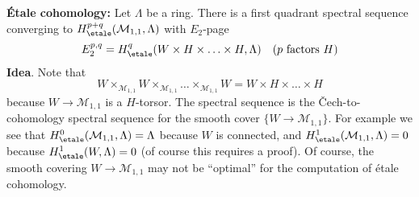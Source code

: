 \medskip\noindent
{\bf \'Etale cohomology:} Let $\Lambda$ be a ring.
There is a first quadrant spectral sequence
converging to $H^{p + q}_\etale(\mathcal{M}_{1, 1}, \Lambda)$
with $E_2$-page
$$
E_2^{p, q} = H_\etale^q(W \times H \times \ldots \times H, \Lambda)
\quad(p\text{ factors }H)
$$
{\bf Idea}. Note that
$$
W \times_{\mathcal{M}_{1, 1}} W \times_{\mathcal{M}_{1, 1}}
\ldots \times_{\mathcal{M}_{1, 1}} W
= W \times H \times \ldots \times H
$$
because $W \to \mathcal{M}_{1, 1}$ is a $H$-torsor. The spectral
sequence is the {\v C}ech-to-cohomology spectral sequence for
the smooth cover $\{W \to \mathcal{M}_{1, 1}\}$. For example we see that
$H^0_\etale(\mathcal{M}_{1, 1}, \Lambda) = \Lambda$ because
$W$ is connected, and $H^1_\etale(\mathcal{M}_{1, 1}, \Lambda) = 0$
because $H^1_\etale(W, \Lambda) = 0$ (of course this requires
a proof). Of course, the smooth covering $W \to \mathcal{M}_{1, 1}$ may
not be ``optimal'' for the computation of \'etale cohomology.




















